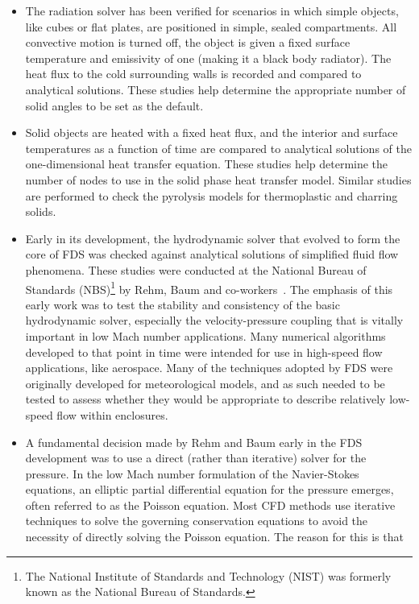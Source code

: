 \documentclass[11pt]{book}
\begin{document}
\begin{itemize}
\item The radiation solver has been verified for scenarios in which
simple objects, like cubes or flat plates, are positioned in simple, sealed compartments. All convective motion is turned off, the object is given a
fixed surface temperature and emissivity of one (making it a black body radiator). The heat flux to the cold surrounding walls is recorded and
compared to analytical solutions.  These studies help determine the appropriate number of solid angles to be set as the default.
\item Solid objects are heated with a fixed heat flux, and the
interior and surface temperatures as a function of time are compared to analytical solutions of the one-dimensional heat transfer equation. These
studies help determine the number of nodes to use in the solid phase heat transfer model. Similar studies are performed to check the pyrolysis models
for thermoplastic and charring solids.
\item Early in its development, the hydrodynamic solver that evolved
to form the core of FDS was checked against analytical solutions of simplified fluid flow phenomena. These studies were conducted at the National
Bureau of Standards (NBS)\footnote{The National Institute of Standards and Technology (NIST) was formerly known as the National Bureau of Standards.}
by Rehm, Baum and co-workers~\cite{Rehm:SIAM83,Rehm:SIAM84,Baum:CST84,Rehm:ANM85}. The emphasis of this early work was to test the stability and
consistency of the basic hydrodynamic solver, especially the velocity-pressure coupling that is vitally important in low Mach number applications.
Many numerical algorithms developed to that point in time were intended for use in high-speed flow applications, like aerospace. Many of the
techniques adopted by FDS were originally developed for meteorological models, and as such needed to be tested to assess whether they would be
appropriate to describe relatively low-speed flow within enclosures.
\item A fundamental decision made by Rehm and Baum early in the FDS
development was to use a direct (rather than iterative) solver for the pressure. In the low Mach number formulation of the Navier-Stokes equations,
an elliptic partial differential equation for the pressure emerges, often referred to as the Poisson equation. Most CFD methods use iterative
techniques to solve the governing conservation equations to avoid the necessity of directly solving the Poisson equation. The reason for this is that

\end{itemize}
\end{document}
